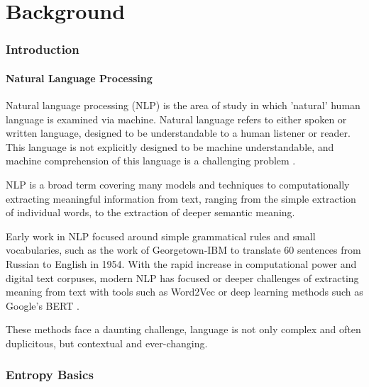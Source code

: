 \chapter{Background \label{ch:background}}

\subsection{Introduction}

\subsubsection{Natural Language Processing} 

Natural language processing (NLP) is the area of study in which 'natural' human language is examined via machine. Natural language refers to either spoken or written language, designed to be understandable to a human listener or reader. This language is not explicitly designed to be machine understandable, and machine comprehension of this language is a challenging problem .

NLP is a broad term covering many models and techniques to computationally extracting meaningful information from text, ranging from the simple extraction of individual words, to the extraction of deeper semantic meaning. 

Early work in NLP focused around simple grammatical rules and small vocabularies, such as the work of Georgetown-IBM  to translate 60 sentences from Russian to English in 1954. With the rapid increase in computational power and digital text corpuses, modern NLP has focused or deeper challenges of extracting meaning from text with tools such as Word2Vec  or deep learning methods such as Google's BERT .

These methods face a daunting challenge, language is not only complex and often duplicitous, but contextual and ever-changing. 


\subsection{Entropy Basics}

